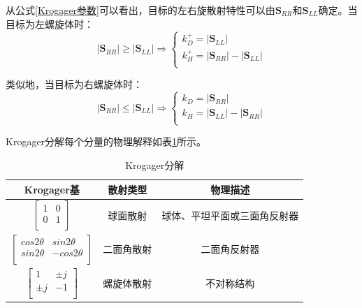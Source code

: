 从公式\eqref{Krogager参数}可以看出，目标的左右旋散射特性可以由$\textbf{S}_{RR}$和$\textbf{S}_{LL}$确定。当目标为左螺旋体时：
\begin{equation}
    \left| \textbf{S}_{RR} \right|\geqslant \left| \textbf{S}_{LL} \right|\Rightarrow \left\{ \begin{array}{c}
        k_{D}^{+}=\left| \textbf{S}_{LL} \right|                                \\
        k_{H}^{+}=\left| \textbf{S}_{RR} \right|-\left| \textbf{S}_{LL} \right| \\
    \end{array} \right.
\end{equation}

类似地，当目标为右螺旋体时：
\begin{equation}
    \left| \textbf{S}_{RR} \right|\leqslant \left| \textbf{S}_{LL} \right|\Rightarrow \left\{ \begin{array}{c}
        k_D=\left| \textbf{S}_{RR} \right|                                \\
        k_H=\left| \textbf{S}_{LL} \right|-\left| \textbf{S}_{RR} \right| \\
    \end{array} \right.
\end{equation}

Krogager分解每个分量的物理解释如表\ref{Krogager table}所示。
\begin{table}[h]
    \caption{Krogager分解}
    \begin{tabular}{ccc}
        \toprule[1.5bp]
        Krogager基                   & 散射类型  & 物理描述                   \\
        \midrule[0.75bp]
        $\left[ \begin{matrix}
                            1 & 0 \\
                            0 & 1 \\
                        \end{matrix} \right] $      & 球面散射  & 球体、平坦平面或三面角反射器 \\
        $\left[ \begin{matrix}
                            cos2\theta & sin2\theta  \\
                            sin2\theta & -cos2\theta \\
                        \end{matrix} \right] $ & 二面角散射 & 二面角反射器              \\
        $\left[ \begin{matrix}
                            1     & \pm j \\
                            \pm j & -1    \\
                        \end{matrix} \right] $      & 螺旋体散射 & 不对称结构          \\
        \bottomrule[1.5bp]
    \end{tabular}
    \label{Krogager table}
\end{table}


